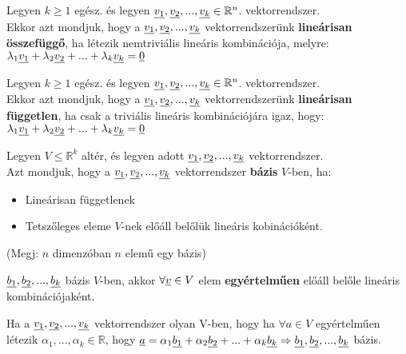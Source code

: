 	\begin{frame}
	\begin{tcolorbox}[title={Def.: Lineáris összefüggőség}]
			Legyen $k \geq 1$ egész. és legyen $\underline{v_1}, \underline{v_2}, ..., \underline{v_k} \in \mathbb{R}^n$. vektorrendszer.\\
			Ekkor azt mondjuk, hogy a $\underline{v_1}, \underline{v_2}, ..., \underline{v_k}$ vektorrendszerünk \textbf{lineárisan összefüggő}, ha létezik nemtriviális lineáris kombinációja, melyre:\\
			${\lambda}_1\underline{v_1} + {\lambda}_2\underline{v_2} + ... + {\lambda}_k\underline{v_k} = \underline{0}$
		\end{tcolorbox}
		
		\begin{tcolorbox}[title={Def.: Lineáris függetlenség}]
			Legyen $k \geq 1$ egész. és legyen $\underline{v_1}, \underline{v_2}, ..., \underline{v_k} \in \mathbb{R}^n$. vektorrendszer.\\
			Ekkor azt mondjuk, hogy a $\underline{v_1}, \underline{v_2}, ..., \underline{v_k}$ vektorrendszerünk \textbf{lineárisan független}, ha csak a triviális lineáris kombinációjára igaz, hogy:\\
			${\lambda}_1\underline{v_1} + {\lambda}_2\underline{v_2} + ... + {\lambda}_k\underline{v_k} = \underline{0}$
		\end{tcolorbox}
		
		\begin{tcolorbox}[title={Def.: Bázis}]
			Legyen $ V \leq \mathbb{R}^k$ altér, és legyen adott $\underline{v_1}, \underline{v_2}, ..., \underline{v_k}$ vektorrendszer.\\
			Azt mondjuk, hogy a $\underline{v_1}, \underline{v_2}, ..., \underline{v_k}$ vektorrendszer \textbf{bázis} $V$-ben, ha:\\
			\begin{itemize}
				\item Lineárisan függetlenek
				\item Tetszőleges eleme $V$-nek előáll belőlük lineáris kobinációként.
			\end{itemize}
			\mmedskip
			
			 (Megj:   $n$ dimenzóban $n$ elemű egy bázis)
		\end{tcolorbox}
		
		\begin{tcolorbox}[title={Tétel: Lineáris kombináció, és bázisok}]
			$\underline{b_1}, \underline{b_2}, ..., \underline{b_k}$ bázis $V$-ben, akkor $\forall \underline{v} \in V$ elem \textbf{egyértelműen} előáll belőle lineáris kombinációjaként.
		\end{tcolorbox}
		
		\begin{tcolorbox}[title={Tétel: Bázisok, és Lineáris kombináció}]
			Ha a $\underline{v_1}, \underline{v_2}, ..., \underline{v_k}$ vektorrendszer olyan V-ben, hogy ha $\forall a \in V$ egyértelműen létezik ${\alpha}_1, ..., {\alpha}_k \in \mathbb{R}$, hogy $\underline{a} = {\alpha}_1\underline{b_1} + {\alpha}_2\underline{b_2} + ... + {\alpha}_k\underline{b_k} \Rightarrow \underline{b_1}, \underline{b_2}, ..., \underline{b_k}$ bázis.
		\end{tcolorbox}
		
	\end{frame}
	
